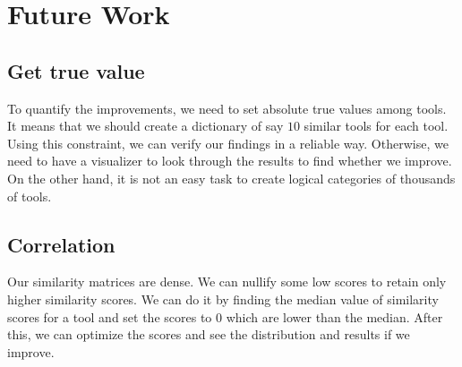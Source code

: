 \chapter{Future Work}

\section{Get true value}
To quantify the improvements, we need to set absolute true values among tools. It means that we should create a dictionary of say $10$ similar tools for each tool. Using this constraint, we can verify our findings in a reliable way. Otherwise, we need to have a visualizer to look through the results to find whether we improve. On the other hand, it is not an easy task to create logical categories of thousands of tools.

\section{Correlation}
Our similarity matrices are dense. We can nullify some low scores to retain only higher similarity scores. We can do it by finding the median value of similarity scores for a tool and set the scores to 0 which are lower than the median. After this, we can optimize the scores and see the distribution and results if we improve. 


